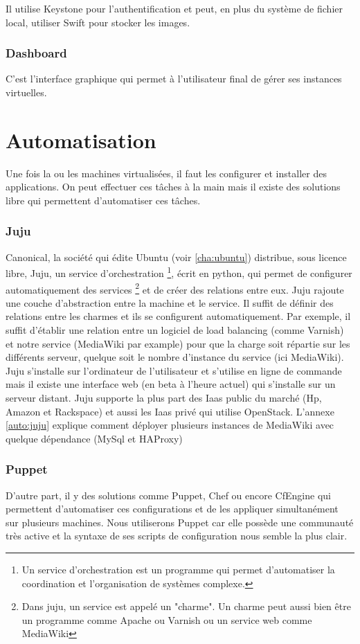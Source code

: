 \documentclass[a4paper,oneside]{report}
\begin{document}
Il utilise Keystone pour l'authentification et peut, en plus du système de fichier local, utiliser Swift pour stocker les images.

\subsubsection{Dashboard}
C'est l'interface graphique qui permet à l'utilisateur final de gérer ses instances virtuelles.

\section{Automatisation}

Une fois la ou les machines virtualisées, il faut les configurer et installer des applications. On peut effectuer ces tâches à la main mais il existe des solutions libre qui permettent d'automatiser ces tâches.

\subsubsection{Juju}
Canonical, la société qui édite Ubuntu (voir \ref{cha:ubuntu}) distribue, sous licence libre, Juju, un service d'orchestration
\footnote{Un service d'orchestration est un programme qui permet d'automatiser la coordination et l'organisation de systèmes complexe.}, 
écrit en python, qui permet de configurer automatiquement des services
\footnote{Dans juju, un service est appelé un "charme". Un charme peut aussi bien être un programme comme Apache ou Varnish ou un service web comme MediaWiki} 
et de créer des relations entre eux. 
Juju rajoute une couche d'abstraction entre la machine et le service. Il suffit de définir des relations entre les charmes et ils se configurent automatiquement. 
Par exemple, il suffit d'établir une relation entre un logiciel de load balancing (comme Varnish) et notre service (MediaWiki par example) pour que la charge soit répartie sur les différents serveur, quelque soit le nombre d'instance du service (ici MediaWiki).
Juju s'installe sur l'ordinateur de l'utilisateur et s'utilise en ligne de commande mais il existe une interface web (en beta à l'heure actuel) qui s'installe sur un serveur distant.
Juju supporte la plus part des Iaas public du marché (Hp, Amazon et Rackspace) et aussi les Iaas privé qui utilise OpenStack.
L'annexe \ref{auto:juju} explique comment déployer plusieurs instances de MediaWiki avec quelque dépendance (MySql et HAProxy)

\subsubsection{Puppet}
D'autre part, il y des solutions comme Puppet, Chef ou encore CfEngine qui permettent d'automatiser ces configurations et de les appliquer simultanément sur plusieurs machines.
Nous utiliserons Puppet car elle possède une communauté très active et la syntaxe de ses scripts de configuration nous semble la plus clair.
\end{document}
